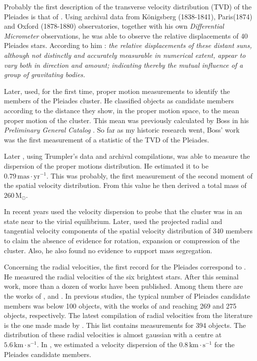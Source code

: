 Probably the first description of the transverse velocity distribution (TVD) of the Pleiades is that of \citet{1884MNRAS..44..355P}. Using archival data from  Königsberg (1838-1841), Paris(1874) and Oxford (1878-1880) observatories, together with his own \emph{Differential Micrometer} observations, he was able to observe the relative displacements of 40 Pleiades stars. According to him \citep{1884MNRAS..44..355P}: \textit{the relative displacements of these distant suns, although not distinctly and accurately measurable in numerical extent, appear to vary both in direction and amount; indicating thereby the mutual influence of a group of gravitating bodies.} 

Later, \citet{Trumpler1921} used, for the first time, proper motion measurements to identify the members of the Pleiades cluster. He classified objects as candidate members according to the distance they show, in the proper motion space, to the mean proper motion of the cluster. This mean was previously calculated by Boss in his \emph{Preliminary General Catalog} \citep{1910pgcs.book.....B}. So far as my historic research went, Boss' work was the first measurement of a statistic of the TVD of the Pleiades. 

Later \citet{1938AJ.....47...25T}, using Trumpler's data and archival compilations, was able to measure the dispersion of the proper motions distribution. He estimated it to be $0.79\,\mathrm{mas\cdot yr^{-1}}$. This was probably, the first measurement of the second moment of the spatial velocity distribution. From this value he then derived a total mass of $260\,\mathrm{M_{\odot}}$.

In recent years \citet{Pinfield1998} used the velocity dispersion to probe that the cluster was in an state near to the virial equilibrium. Later, \citet{2006ARep...50..714L} used the projected radial and tangential velocity components of the spatial velocity distribution of 340 members to claim the absence of evidence for rotation, expansion or compression of the cluster. Also, he also found no evidence to support mass segregation. 

Concerning the radial velocities, the first record for the Pleiades correspond to \citet{1904ApJ....19..338A}. He measured the radial velocities of the six brightest stars. After this seminal work, more than a dozen of works have been published. Among them there are the works of \citet{1924PhDT.........1W,1944ApJ...100..360S,1979BICDS..16....2M,1991ApJ...377..141L,1992A&A...255..130R,1994AJ....108..160S,1997A&A...320...74M,1996ApJ...469..706M,2000AJ....119.1303T,2006ARep...50..714L,2009AAS...21340702W,2009A&A...498..949M}, and \citet{2013AJ....146..134K}. In previous studies, the typical number of Pleiades candidate members was below 100 objects, with the works of \citet{2009AAS...21340702W} and \citet{2009A&A...498..949M} reaching 269 and 275 objects, respectively. The latest compilation of radial velocities from the literature is the one made made by \citet{Galli2017}. This list contains measurements for 394 objects. The distribution of these radial velocities is almost gaussian with a centre at $5.6\,\mathrm{km \cdot s^{-1}}$. In \citet{Galli2017}, we estimated a velocity dispersion of the $0.8\,\mathrm{ km\cdot s^{-1}}$ for the Pleiades candidate members.

